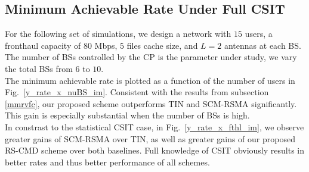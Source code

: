 \documentclass[12pt,draftcls,onecolumn]{IEEEtran}
\theoremstyle{remark}
\theoremstyle{definition}
\begin{document}
{%
\subsection{Minimum Achievable Rate Under Full CSIT}
For the following set of simulations, we design a network with $15$ users, a fronthaul capacity of $80$ Mbps, $5$ files cache size, and $L=2$ antennas at each BS. The number of BSs controlled by the CP is the parameter under study, we vary the total BSs from $6$ to $10$. \\
\indent The minimum achievable rate is plotted as a function of the number of users in Fig.~\ref{y_rate_x_nuBS_im}. Consistent with the results from subsection \ref{mmrvfc}, our proposed scheme outperforms TIN and SCM-RSMA significantly. This gain is especially substantial when the number of BSs is high.\\
\indent In constrast to the statistical CSIT case, in Fig.~\ref{y_rate_x_fthl_im}, we observe greater gains of SCM-RSMA over TIN, as well as greater gains of our proposed RS-CMD scheme over both baselines. Full knowledge of CSIT obviously results in better rates and thus better performance of all schemes.
}
\end{document}
